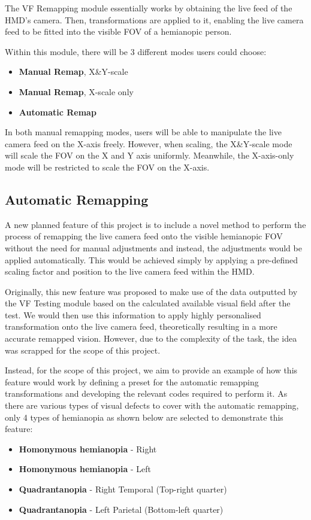 \documentclass{l4proj}
\begin{document}
The VF Remapping module essentially works by obtaining the live feed of the HMD's camera. Then, transformations are applied to it, enabling the live camera feed to be fitted into the visible FOV of a hemianopic person. 

Within this module, there will be 3 different modes users could choose:
\begin{itemize}
    \item \textbf{Manual Remap}, X\&Y-scale
    \item \textbf{Manual Remap}, X-scale only
    \item \textbf{Automatic Remap}
\end{itemize}

In both manual remapping modes, users will be able to manipulate the live camera feed on the X-axis freely. However, when scaling, the X\&Y-scale mode will scale the FOV on the X and Y axis uniformly. Meanwhile, the X-axis-only mode will be restricted to scale the FOV on the X-axis.

\subsection{Automatic Remapping}
A new planned feature of this project is to include a novel method to perform the process of remapping the live camera feed onto the visible hemianopic FOV without the need for manual adjustments and instead, the adjustments would be applied automatically. This would be achieved simply by applying a pre-defined scaling factor and position to the live camera feed within the HMD.

Originally, this new feature was proposed to make use of the data outputted by the VF Testing module based on the calculated available visual field after the test. We would then use this information to apply highly personalised transformation onto the live camera feed, theoretically resulting in a more accurate remapped vision. However, due to the complexity of the task, the idea was scrapped for the scope of this project. 

Instead, for the scope of this project, we aim to provide an example of how this feature would work by defining a preset for the automatic remapping transformations and developing the relevant codes required to perform it. As there are various types of visual defects to cover with the automatic remapping, only 4 types of hemianopia as shown below are selected to demonstrate this feature:

\begin{itemize}
\label{item:autoRemapConds}
    \item \textbf{Homonymous hemianopia} - Right
    \item \textbf{Homonymous hemianopia} - Left
    \item \textbf{Quadrantanopia} - Right Temporal (Top-right quarter)
    \item \textbf{Quadrantanopia} - Left Parietal (Bottom-left quarter)
\end{itemize}
\end{document}
